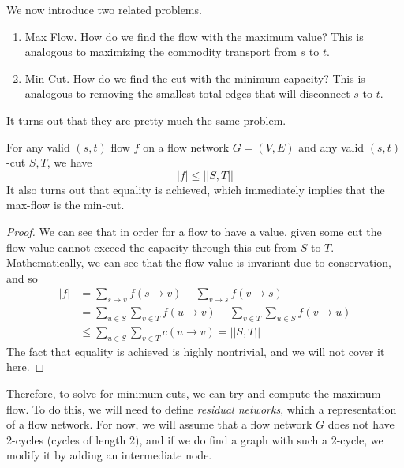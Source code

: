   We now introduce two related problems. 
  \begin{enumerate}
    \item Max Flow. How do we find the flow with the maximum value? This is analogous to maximizing the commodity transport from $s$ to $t$.  
    \item Min Cut. How do we find the cut with the minimum capacity? This is analogous to removing the smallest total edges that will disconnect $s$ to $t$. 
  \end{enumerate} 

  It turns out that they are pretty much the same problem. 

  \begin{theorem}
    For any valid $(s, t)$ flow $f$ on a flow network $G = (V, E)$ and any valid $(s, t)$-cut $S, T$, we have 
    \begin{equation}
      |f| \leq ||S, T||
    \end{equation} 
    It also turns out that equality is achieved, which immediately implies that the max-flow is the min-cut. 
  \end{theorem}
  \begin{proof}
    We can see that in order for a flow to have a value, given some cut the flow value cannot exceed the capacity through this cut from $S$ to $T$. Mathematically, we can see that the flow value is invariant due to conservation, and so  
    \begin{align}
      |f| & = \sum_{s \rightarrow v} f(s \rightarrow v) - \sum_{v \rightarrow s} f(v \rightarrow s) \\ 
          & = \sum_{u \in S} \sum_{v \in T} f(u \rightarrow v) - \sum_{v \in T} \sum_{u \in S} f(v \rightarrow u) \\ 
          & \leq \sum_{u \in S} \sum_{v \in T} c(u \rightarrow v) = ||S, T||
    \end{align}
    The fact that equality is achieved is highly nontrivial, and we will not cover it here. 
  \end{proof} 

  Therefore, to solve for minimum cuts, we can try and compute the maximum flow. To do this, we will need to define \textit{residual networks}, which a representation of a flow network. For now, we will assume that a flow network $G$ does not have 2-cycles (cycles of length 2), and if we do find a graph with such a 2-cycle, we modify it by adding an intermediate node. 

